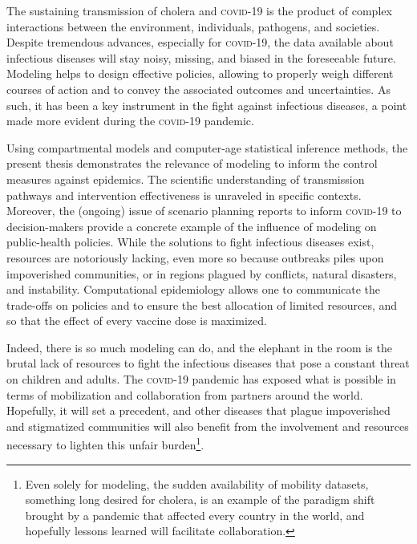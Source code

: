 The sustaining transmission of cholera and \textsc{covid}-19 is the product of complex interactions between the environment, individuals, pathogens, and societies. Despite tremendous advances, especially for \textsc{covid}-19, the data available about infectious diseases will stay noisy, missing, and biased in the foreseeable future. Modeling helps to design effective policies, allowing to properly weigh different courses of action and to convey the associated outcomes and uncertainties. As such, it has been a key instrument in the fight against infectious diseases, a point made more evident during the \textsc{covid}-19 pandemic. 

Using compartmental models and computer-age statistical inference methods, the present thesis demonstrates the relevance of modeling to inform the control measures against epidemics. The scientific understanding of transmission pathways and intervention effectiveness is unraveled in specific contexts. Moreover, the (ongoing) issue of scenario planning reports to inform \textsc{covid}-19 to decision-makers provide a concrete example of the influence of modeling on public-health policies. 
While the solutions to fight infectious diseases exist, resources are notoriously lacking, even more so because outbreaks piles upon impoverished communities, or in regions plagued by conflicts, natural disasters, and instability. Computational epidemiology allows one to communicate the trade-offs on policies and to ensure the best allocation of limited resources, and so that \eg the effect of every vaccine dose is maximized. %

Indeed, there is so much modeling can do, and the elephant in the room is the brutal lack of resources to fight the infectious diseases that pose a constant threat on children and adults. The \textsc{covid}-19 pandemic has exposed what is possible in terms of mobilization and collaboration from partners around the world. Hopefully, it will set a precedent, and other diseases that plague impoverished and stigmatized communities will also benefit from the involvement and resources necessary to lighten this unfair burden\footnote[][-2\baselineskip]{Even solely for modeling, the sudden availability of mobility datasets, something long desired for cholera, is an example of the paradigm shift brought by a pandemic that affected every country in the world, and hopefully lessons learned will facilitate collaboration.}.

